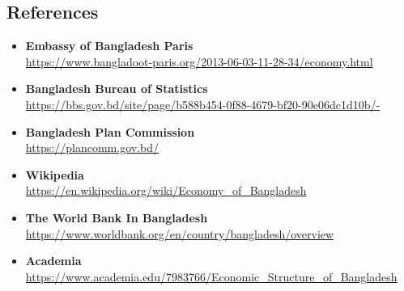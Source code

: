 \subsection{References}
\begin{itemize}
	\item \textbf{Embassy of Bangladesh Paris}\\ \url{https://www.bangladoot-paris.org/2013-06-03-11-28-34/economy.html}
	\item \textbf{Bangladesh Bureau of Statistics}\\ \url{https://bbs.gov.bd/site/page/b588b454-0f88-4679-bf20-90e06dc1d10b/-}
	\item \textbf{Bangladesh Plan Commission}\\ \url{https://plancomm.gov.bd/}
	\item \textbf{Wikipedia}\\ \url{https://en.wikipedia.org/wiki/Economy_of_Bangladesh}
	\item \textbf{The World Bank In Bangladesh }\\ \url{https://www.worldbank.org/en/country/bangladesh/overview}
	\item \textbf{Academia}\\ \url{https://www.academia.edu/7983766/Economic_Structure_of_Bangladesh}
\end{itemize}



